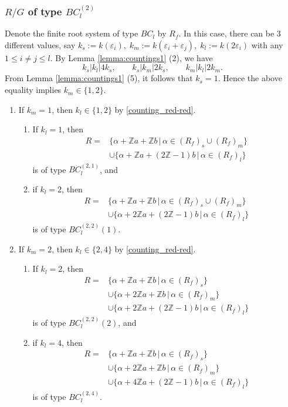 \documentclass[11pt]{amsart}
\newcommand{\Z}{\mathbb{Z}}
\newcommand{\vep}{\varepsilon}
\begin{document}
{\subsubsection{$R/G$ of type $BC_l^{(2)}$}
Denote the finite root system of type $BC_l$ by $R_f$. 
In this case, there can be $3$ different values, say 
$k_s:=k(\vep_i), \; k_m:=k(\vep_i+\vep_j), \; k_l:=k(2\vep_i)$ with any $1\leq i\neq j\leq l$. 
By Lemma \ref{lemma:countings1} (2), we have
\begin{equation}\label{counting_red-red}
k_s \vert k_l \vert 4k_s, \qquad k_s \vert k_m \vert 2k_s, \qquad k_m \vert k_l \vert 2k_m.
\end{equation}
From Lemma \ref{lemma:countings1} (5), it follows that $k_s=1$. Hence the 
above equality implies $k_m \in \{1,2\}$. 
\begin{enumerate}
\item If $k_m=1$, then $k_l \in \{1,2\}$ by \eqref{counting_red-red}.
\begin{enumerate}
\item[i)] If $k_l=1$, then 
\begin{align*}
R=
&\{ \alpha+\Z a+\Z b\, \vert\,  \alpha \in (R_f)_s \cup (R_f)_m \} \\
&\cup
    \{ \alpha+\Z a+(2\Z -1)b\, \vert \, \alpha \in (R_f)_l \} 
\end{align*}
is of type $BC_l^{(2,1)}$, and 
\item[ii)] if $k_l=2$, then 
\begin{align*}
R=
&\{ \alpha+\Z a+\Z b\, \vert\,  \alpha \in (R_f)_s \cup (R_f)_m\} \\
&\cup
  \{ \alpha+2\Z a+(2\Z -1)b\, \vert \, \alpha \in (R_f)_l \} 
\end{align*}
is of type $BC_l^{(2,2)}(1)$.
\end{enumerate}
\item If $k_m=2$, then $k_l \in \{2,4\}$ by \eqref{counting_red-red}.
\begin{enumerate}
\item[i)] If $k_l=2$, then
\begin{align*}
R=
&\{ \alpha+\Z a+\Z b\, \vert\,  \alpha \in (R_f)_s \} \\
&\cup 
   \{ \alpha+2\Z a+\Z b\, \vert \, \alpha \in (R_f)_m \} \\
&\cup
    \{ \alpha+2\Z a+(2\Z -1)b\, \vert \, \alpha \in (R_f)_l \} 
\end{align*}
is of type $BC_l^{(2,2)}(2)$, and 
\item[ii)] if $k_l=4$, then 
\begin{align*}
R=
&\{ \alpha+\Z a+\Z b\, \vert\,  \alpha \in (R_f)_s \} \\
&\cup
    \{ \alpha+2\Z a+\Z b\, \vert \, \alpha \in (R_f)_m\} \\
&\cup
    \{ \alpha+4\Z a+(2\Z -1)b\, \vert \, \alpha \in (R_f)_l \} 
\end{align*}
is of type $BC_l^{(2,4)}$.
\end{enumerate}
\end{enumerate}

}
\end{document}
